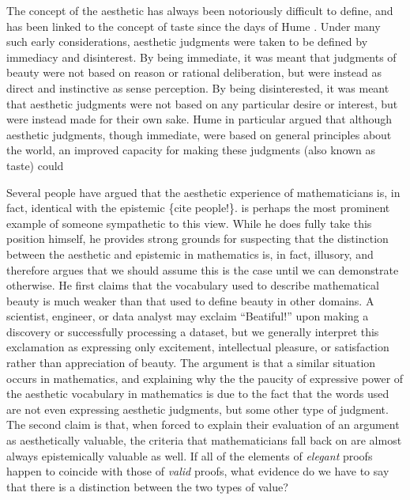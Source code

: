\documentclass[a4paper,man,natbib]{apa6}
\begin{document}
The concept of the aesthetic has always been notoriously difficult to define, and has been linked to the concept
of taste since the days of Hume \citep{sep-aesthetic-concept}. Under many such early considerations, aesthetic
judgments were taken to be defined by immediacy and disinterest. By being immediate, it was meant that judgments
of beauty were not based on reason or rational deliberation, but were instead as direct and instinctive as
sense perception. By being disinterested, it was meant that aesthetic judgments were not based on any particular
desire or interest, but were instead made for their own sake. Hume in particular argued that although aesthetic
judgments, though immediate, were based on general principles about the world, an improved capacity for making
these judgments (also known as taste) could

Several people have argued that the aesthetic experience of mathematicians is, in fact, identical with the epistemic
 \{cite people!\}.
\cite{todd_unmasking_2008} is perhaps the most prominent example of someone sympathetic to this view. While he
does fully take this position himself, he provides strong grounds for suspecting that the distinction between
the aesthetic and epistemic in mathematics is, in fact, illusory, and therefore argues that we should assume 
this is the case until we can demonstrate otherwise. He first claims that the vocabulary used to
describe mathematical beauty is much weaker than that used to define beauty in other domains. A scientist, engineer,
or data analyst may exclaim ``Beatiful!'' upon making a discovery or successfully processing a dataset, but we generally
interpret this exclamation as expressing only excitement, intellectual pleasure, or satisfaction rather than appreciation
of beauty. The argument is that a similar situation occurs in mathematics, and explaining why the the paucity of expressive
power of the aesthetic vocabulary in mathematics
is due to the fact that the words used are not even expressing aesthetic judgments, but some other type of judgment. The
second claim is that, when forced to explain their evaluation of an argument
as aesthetically valuable, the criteria that mathematicians fall back on are almost always epistemically valuable as well.
If all of the elements of \textit{elegant} proofs happen to coincide with those of \textit{valid} proofs, what evidence do we have to say
that there is a distinction between the two types of value?
\end{document}
